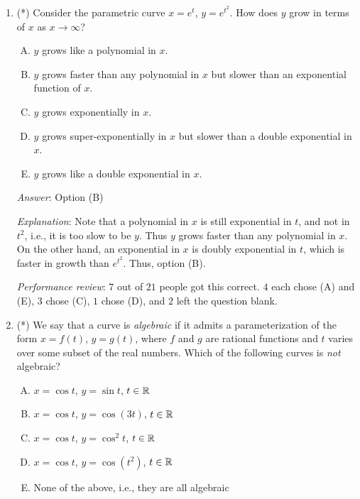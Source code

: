 \documentclass[10pt]{amsart}
\begin{document}
\begin{enumerate}
  {\em Performance review}: $15$ out of $21$ people got this
  correct. $2$ chose (B), $2$ left the question blank, $1$ each chose
  (A) and (D).

\item (*) Consider the parametric curve $x = e^t$, $y = e^{t^2}$. How does
  $y$ grow in terms of $x$ as $x \to \infty$?

  \begin{enumerate}[(A)]
  \item $y$ grows like a polynomial in $x$.
  \item $y$ grows faster than any polynomial in $x$ but slower than an
    exponential function of $x$.
  \item $y$ grows exponentially in $x$.
  \item $y$ grows super-exponentially in $x$ but slower than a double
    exponential in $x$.
  \item $y$ grows like a double exponential in $x$.
  \end{enumerate}

  {\em Answer}: Option (B)

  {\em Explanation}: Note that a polynomial in $x$ is still
  exponential in $t$, and not in $t^2$, i.e., it is too slow to be
  $y$. Thus $y$ grows faster than any polynomial in $x$. On the other
  hand, an exponential in $x$ is doubly exponential in $t$, which is
  faster in growth than $e^{t^2}$. Thus, option (B).

  {\em Performance review}: $7$ out of $21$ people got this
  correct. $4$ each chose (A) and (E), $3$ chose (C), $1$ chose (D),
  and $2$ left the question blank.

\item (*) We say that a curve is {\em algebraic} if it admits a
  parameterization of the form $x = f(t)$, $y = g(t)$, where $f$ and
  $g$ are rational functions and $t$ varies over some subset of the real
  numbers. Which of the following curves is {\em not} algebraic?

  \begin{enumerate}[(A)]
  \item $x = \cos t$, $y = \sin t$, $t \in \mathbb{R}$
  \item $x = \cos t$, $y = \cos(3t)$, $t \in \mathbb{R}$
  \item $x = \cos t$, $y = \cos^2t$, $t \in \mathbb{R}$
  \item $x = \cos t$, $y = \cos(t^2)$, $t \in \mathbb{R}$
  \item None of the above, i.e., they are all algebraic
  \end{enumerate}


\end{enumerate}
\end{document}
